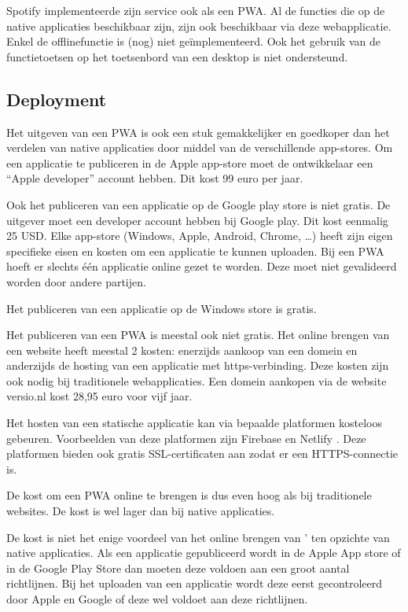 	Spotify implementeerde zijn service ook als een PWA. \autocite{Spotify2020} Al de functies die op de native applicaties beschikbaar zijn, zijn ook beschikbaar via deze webapplicatie. Enkel de offlinefunctie is (nog) niet geïmplementeerd. Ook het gebruik van de functietoetsen op het toetsenbord van een desktop is niet ondersteund.
	\autocite{Vu2019}
	
	
\subsection{Deployment}

	Het uitgeven van een PWA is ook een stuk gemakkelijker en goedkoper dan het verdelen van native applicaties door middel van de verschillende app-stores. 
	Om een applicatie te publiceren in de Apple app-store moet de ontwikkelaar een “Apple developer” account hebben. Dit kost 99 euro per jaar. 
	\autocite{Apple2020b}
	
	Ook het publiceren van een applicatie op de Google play store is niet gratis. De uitgever moet een developer account hebben bij Google play. Dit kost eenmalig 25 USD.
	Elke app-store (Windows, Apple, Android, Chrome, …) heeft zijn eigen specifieke eisen en kosten om een applicatie te kunnen uploaden. Bij een PWA hoeft er slechts één applicatie online gezet te worden. Deze moet niet gevalideerd worden door andere partijen. 
	\autocite{GooglePlay2020}
	
	Het publiceren van een applicatie op de Windows store is gratis.
	
	Het publiceren van een PWA is meestal ook niet gratis. Het online brengen van een website heeft meestal 2 kosten: enerzijds aankoop van een domein en anderzijds de hosting van een applicatie met https-verbinding. Deze kosten zijn ook nodig bij traditionele webapplicaties.
	Een domein aankopen via de website versio.nl kost 28,95 euro voor vijf jaar.
	\autocite{Versio2020}
	
	Het hosten van een statische applicatie kan via bepaalde platformen kosteloos gebeuren. Voorbeelden van deze platformen zijn Firebase \autocite{Firebase2020} en Netlify \autocite{Netflify2020}. 	
	Deze platformen bieden ook gratis SSL-certificaten aan zodat er een HTTPS-connectie is. 
	
	De kost om een PWA online te brengen is dus even hoog als bij traditionele websites. De kost is wel lager dan bij native applicaties. 	
	
	De kost is niet het enige voordeel van het online brengen van ' ten opzichte van native applicaties. Als een applicatie gepubliceerd wordt in de Apple App store of in de Google Play Store dan moeten deze voldoen aan een groot aantal richtlijnen. Bij het uploaden van een applicatie wordt deze eerst gecontroleerd door Apple en Google of deze wel voldoet aan deze richtlijnen. 
	\autocite{Apple2020c}
	\autocite{GooglePlay2020a}
	
